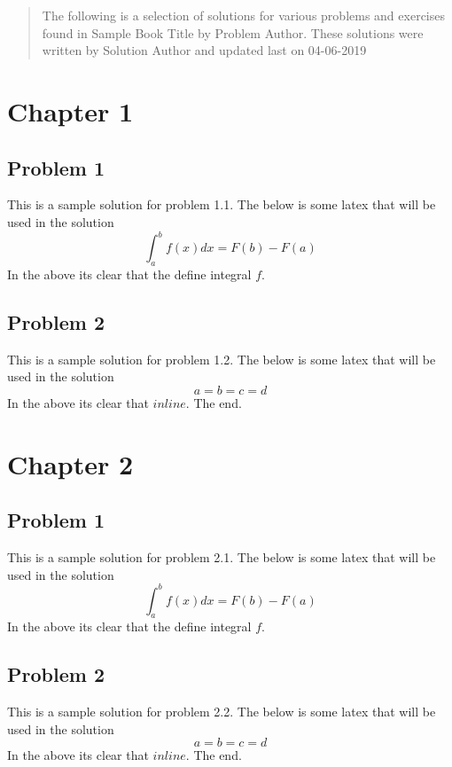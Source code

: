 \documentclass[12pt]{article}
\begin{document}
\maketitle

\begin{abstract}
The following is a selection of solutions for various problems and exercises found 
in Sample Book Title by Problem Author. These solutions were written by Solution Author and updated 
last on 04-06-2019
\end{abstract}

\tableofcontents
\newpage

\section{ Chapter 1 }
\subsection{ Problem 1 }
This is a sample solution for problem 1.1. The below is some latex that
will be used in the solution \[\int_{a}^b f(x) dx = F(b) - F(a)\] In the
above its clear that the define integral \(f\).


\subsection{ Problem 2 }
This is a sample solution for problem 1.2. The below is some latex that
will be used in the solution \[a = b = c = d\] In the above its clear
that \(inline\). The end.


\section{ Chapter 2 }
\subsection{ Problem 1 }
This is a sample solution for problem 2.1. The below is some latex that
will be used in the solution \[\int_{a}^b f(x) dx = F(b) - F(a)\] In the
above its clear that the define integral \(f\).


\subsection{ Problem 2 }
This is a sample solution for problem 2.2. The below is some latex that
will be used in the solution \[a = b = c = d\] In the above its clear
that \(inline\). The end.
\end{document}
